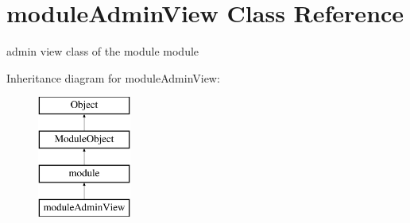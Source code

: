\hypertarget{classmoduleAdminView}{\section{module\-Admin\-View Class Reference}
\label{classmoduleAdminView}
}


admin view class of the module module  


Inheritance diagram for module\-Admin\-View\-:\begin{figure}[H]
\begin{center}
\leavevmode
\includegraphics[height=4.000000cm]{classmoduleAdminView}
\end{center}
\end{figure}
